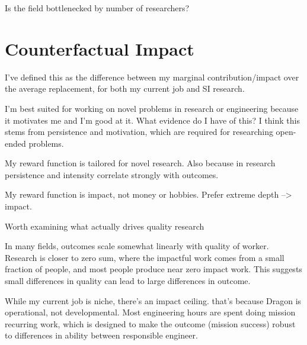 \documentclass{article}
\begin{document}
Is the field bottlenecked by number of researchers?


\section*{Counterfactual Impact}

I've defined this as the difference between my marginal contribution/impact over the average replacement, for both my current job and SI research.

I'm best suited for working on novel problems in research or engineering because it motivates me and I'm good at it. What evidence do I have of this? I think this stems from persistence and motivation, which are required for researching open-ended problems.

My reward function is tailored for novel research. Also because in research persistence and intensity correlate strongly with outcomes.

My reward function is impact, not money or hobbies. Prefer extreme depth --> impact.

Worth examining what actually drives quality research

In many fields, outcomes scale somewhat linearly with quality of worker.
Research is closer to zero sum, where the impactful work comes from a small fraction of people, and most people produce near zero impact work. This suggests small differences in quality can lead to large differences in outcome.

While my current job is niche, there's an impact ceiling. that's because Dragon is operational, not developmental. Most engineering hours are spent doing mission recurring work, which is designed to make the outcome (mission success) robust to differences in ability between responsible engineer.
\end{document}
